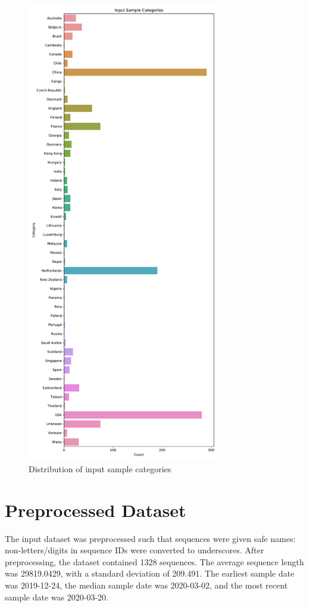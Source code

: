 \documentclass{article}
\begin{document}
\begin{figure}[h]
\centering
\includegraphics[width=0.75\textwidth,keepaspectratio]{./figs/input_categories.pdf}
\caption{Distribution of input sample categories}
\end{figure}

\section{Preprocessed Dataset}
The input dataset was preprocessed such that sequences were given safe names: non-letters/digits in sequence IDs were converted to underscores. After preprocessing, the dataset contained 1328 sequences. The average sequence length was 29819.0429, with a standard deviation of 209.491. The earliest sample date was 2019-12-24, the median sample date was 2020-03-02, and the most recent sample date was 2020-03-20.
\end{document}
